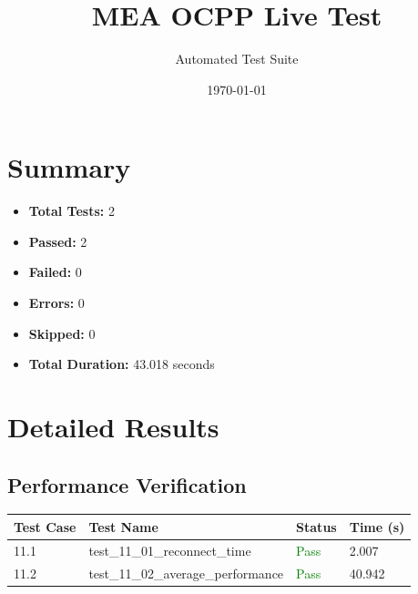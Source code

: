 \documentclass{article}
\title{MEA OCPP Live Test}
\author{Automated Test Suite}
\date{\today}
\begin{document}
\maketitle

\section{Summary}
\begin{itemize}
    \item \textbf{Total Tests:} 2
    \item \textbf{Passed:} 2
    \item \textbf{Failed:} 0
    \item \textbf{Errors:} 0
    \item \textbf{Skipped:} 0
    \item \textbf{Total Duration:} 43.018 seconds
\end{itemize}

\section{Detailed Results}
\subsection{Performance Verification}

\begin{longtable}{p{} p{} p{} p{}}
\toprule
\textbf{Test Case} & \textbf{Test Name} & \textbf{Status} & \textbf{Time (s)} \\
\midrule
\endhead
11.1 & test\_11\_01\_reconnect\_time & \textcolor{green}{Pass} & 2.007 \\
11.2 & test\_11\_02\_average\_performance & \textcolor{green}{Pass} & 40.942 \\
\bottomrule
\end{longtable}
\end{document}
